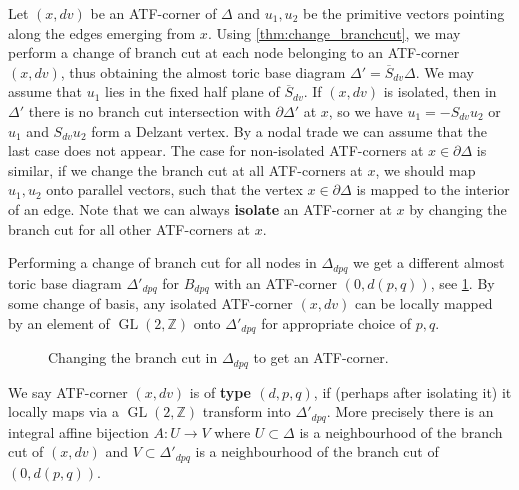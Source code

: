 \documentclass[12pt,a4paper,draft]{scrartcl}
\DeclareMathOperator{\GL}{GL}
\begin{document}
Let $(x,dv)$ be an ATF-corner of $Δ$ and $u_1,u_2$ be the primitive vectors pointing along the edges emerging from $x$.
Using \cref{thm:change_branchcut}, we may perform a change of branch cut at each node belonging to an ATF-corner $(x,dv)$, thus obtaining the almost toric base diagram $Δ' = \overline{S}_{dv}Δ$.
We may assume that $u_1$ lies in the fixed half plane of $\overline{S}_{dv}$.
If $(x,dv)$ is isolated, then in $Δ'$ there is no branch cut intersection with $∂Δ'$ at $x$, so we have $u_1 = -S_{dv}u_2$ or $u_1$ and $S_{dv}u_2$ form a Delzant vertex.
By a nodal trade we can assume that the last case does not appear.
The case for non-isolated ATF-corners at $x ∈ ∂Δ$ is similar, if we change the branch cut at all ATF-corners at $x$, we should map $u_1,u_2$ onto parallel vectors, such that the vertex $x ∈ ∂Δ$ is mapped to the interior of an edge.
Note that we can always \textbf{isolate} an ATF-corner at $x$ by changing the branch cut for all other ATF-corners at $x$.

Performing a change of branch cut for all nodes in $Δ_{dpq}$ we get a different almost toric base diagram $Δ'_{dpq}$ for $B_{dpq}$ with an ATF-corner $(0,d(p,q))$, see \cref{fig:Bdpq_moment_image_alt}.
By some change of basis, any isolated ATF-corner $(x,dv)$ can be locally mapped by an element of $\GL(2,ℤ)$ onto $Δ'_{dpq}$ for appropriate choice of $p,q$.

\begin{figure}
\centering
{}   
\caption{Changing the branch cut in $Δ_{dpq}$ to get an ATF-corner.}
\label{fig:Bdpq_moment_image_alt}
\end{figure}

\begin{definition}
  \label{def:atf_corner_type}
  We say ATF-corner $(x,dv)$ is of \textbf{type $(d,p,q)$}, if (perhaps after isolating it) it locally maps via a $\GL(2,ℤ)$ transform into $Δ'_{dpq}$. More precisely there is an integral affine bijection $A\colon U → V$ where $U ⊂ Δ$ is a neighbourhood of the branch cut of $(x,dv)$ and $V ⊂ Δ'_{dpq}$ is a neighbourhood of the branch cut of $(0,d(p,q))$.
\end{definition}
\end{document}
